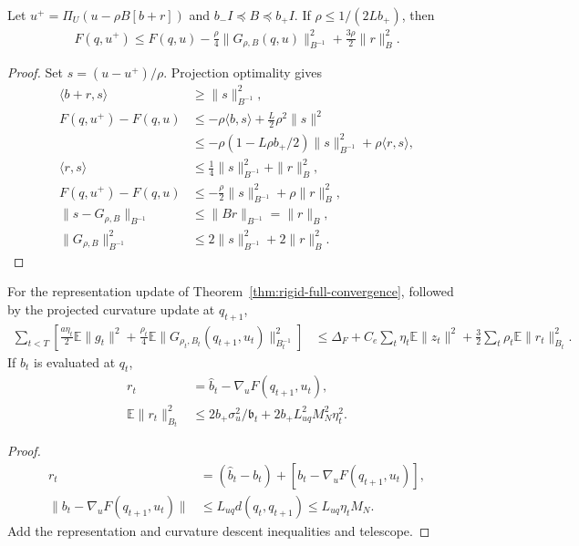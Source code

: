 \begin{proposition}
\label{prop:projected-new}
Let $u^+=\Pi_U(u-\rho B[b+r])$ and $b_-I\preceq B\preceq b_+I$.
If $\rho\le1/(2Lb_+)$, then
\begin{align}\label{eq:rigid-projected-descent}
 F(q,u^+)\le F(q,u)-\frac\rho4\|G_{\rho,B}(q,u)\|_{B^{-1}}^2+
 \frac{3\rho}{2}\|r\|_B^2.
\end{align}
\end{proposition}
\begin{proof}
Set $s=(u-u^+)/\rho$. Projection optimality gives
\begin{align}
 \langle b+r,s\rangle&\ge\|s\|_{B^{-1}}^2,\\
 F(q,u^+)-F(q,u)
 &\le-\rho\langle b,s\rangle+\tfrac L2\rho^2\|s\|^2\\
 &\le-\rho(1-L\rho b_+/2)\|s\|_{B^{-1}}^2+
 \rho\langle r,s\rangle,\\
 \langle r,s\rangle&\le\tfrac14\|s\|_{B^{-1}}^2+\|r\|_B^2,\\
 F(q,u^+)-F(q,u)&\le-\tfrac\rho2\|s\|_{B^{-1}}^2+\rho\|r\|_B^2,\\
 \|s-G_{\rho,B}\|_{B^{-1}}
 &\le\|B r\|_{B^{-1}}=\|r\|_B,\\
 \|G_{\rho,B}\|_{B^{-1}}^2
 &\le2\|s\|_{B^{-1}}^2+2\|r\|_B^2.
\end{align}
\end{proof}

\begin{corollary}
For the representation update of Theorem~\ref{thm:rigid-full-convergence}, followed by the projected curvature update at $q_{t+1}$,
\begin{align}
 \sum_{t<T}\left[\tfrac{a\eta_t}{2}\mathbb E\|g_t\|^2+
 \tfrac{\rho_t}{4}\mathbb E\|G_{\rho_t,B_t}(q_{t+1},u_t)\|_{B_t^{-1}}^2\right]
 &\le\Delta_F+C_e\sum_t\eta_t\mathbb E\|z_t\|^2+
 \tfrac32\sum_t\rho_t\mathbb E\|r_t\|_{B_t}^2.
\end{align}
If $\widehat b_t$ is evaluated at $q_t$,
\begin{align}
 r_t&=\widehat b_t-\nabla_uF(q_{t+1},u_t),\\
 \mathbb E\|r_t\|_{B_t}^2
 &\le2b_+\sigma_u^2/\mathfrak b_t+
 2b_+L_{uq}^2M_N^2\eta_t^2.
\end{align}
\end{corollary}
\begin{proof}
\begin{align}
 r_t&=(\widehat b_t-b_t)+[b_t-\nabla_uF(q_{t+1},u_t)],\\
 \|b_t-\nabla_uF(q_{t+1},u_t)\|
 &\le L_{uq}d(q_t,q_{t+1})\le L_{uq}\eta_tM_N.
\end{align}
Add the representation and curvature descent inequalities and telescope.
\end{proof}


